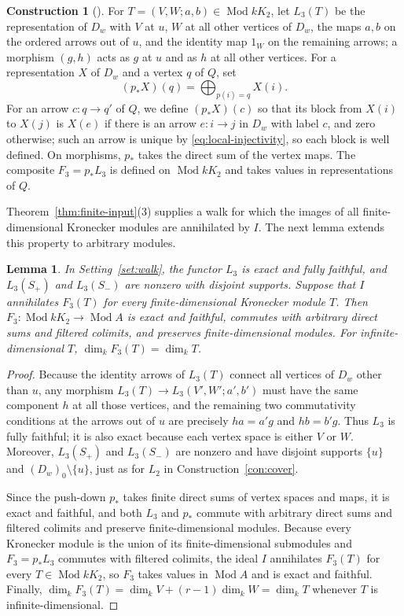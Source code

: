 \documentclass[a4paper,reqno,10pt]{amsart}
\newtheorem{lemma}[theorem]{Lemma}
\theoremstyle{definition}
\newtheorem{construction}[theorem]{Construction}
\DeclareMathOperator{\Mod}{Mod}
\newcommand{\dm}{\dim_k}
\numberwithin{equation}{section}
\begin{document}
\begin{construction}[{\cite[proof of Theorem~7]{Bongartz}}]\label{con:walk}
For $T=(V,W;a,b)\in\Mod kK_2$, let $L_3(T)$ be the representation of $D_w$ with $V$ at $u$, $W$ at all other
vertices of $D_w$, the maps $a,b$ on the ordered arrows out of $u$, and the identity
map $1_W$ on the remaining arrows; a morphism $(g,h)$ acts as $g$ at $u$ and as $h$ at all other vertices.
For a representation $X$ of $D_w$ and a vertex $q$ of $Q$, set
\[
 (p_*X)(q)=\bigoplus_{p(i)=q}X(i).
\]
For an arrow $c:q\to q'$ of $Q$, we define $(p_*X)(c)$ so that its block from $X(i)$ to $X(j)$
is $X(e)$ if there is an arrow $e:i\to j$ in $D_w$ with label $c$, and zero
otherwise; such an arrow is unique by \eqref{eq:local-injectivity}, so
each block is well defined. On morphisms, $p_*$ takes the direct sum of the
vertex maps. The composite $F_3=p_*L_3$ is defined on
$\Mod kK_2$ and takes values in representations of $Q$.
\end{construction}
Theorem~\ref{thm:finite-input}(3) supplies a walk for which the images
of all finite-dimensional Kronecker modules are annihilated by $I$.
The next lemma extends this property to arbitrary modules.
\begin{lemma}\label{lem:F3-properties}
In Setting~\ref{set:walk}, the functor $L_3$ is exact and fully faithful,
and $L_3(S_+)$ and $L_3(S_-)$ are nonzero with disjoint supports.
Suppose that $I$ annihilates $F_3(T)$ for every finite-dimensional
Kronecker module $T$. Then $F_3:\Mod kK_2\to\Mod A$ is exact and
faithful, commutes with arbitrary direct sums and filtered colimits,
and preserves finite-dimensional modules. For infinite-dimensional $T$,
$\dm F_3(T)=\dm T$.
\end{lemma}
\begin{proof}
Because the identity arrows of $L_3(T)$ connect all vertices of $D_w$ other than $u$, any morphism $L_3(T)\to L_3(V',W';a',b')$
must have the same component $h$ at all those vertices, and the remaining two commutativity conditions at the arrows out of $u$ are precisely $ha=a'g$ and $hb=b'g$. Thus $L_3$ is fully
faithful; it is also exact because each vertex space is either $V$ or $W$. Moreover,
$L_3(S_+)$ and $L_3(S_-)$ are nonzero and have disjoint supports $\{u\}$
and $(D_w)_0\setminus\{u\}$, just as for $L_2$ in Construction~\ref{con:cover}.

Since the push-down $p_*$ takes finite direct sums of vertex
spaces and maps, it is exact and faithful, and both $L_3$ and $p_*$ commute
with arbitrary direct sums and filtered colimits and preserve finite-dimensional modules.
Because every Kronecker module is the union of its finite-dimensional
submodules and $F_3=p_*L_3$ commutes with filtered colimits, the ideal
$I$ annihilates $F_3(T)$ for every $T\in\Mod kK_2$, so $F_3$ takes values in $\Mod A$ and is exact and faithful.
Finally, $\dm F_3(T)=\dm V+(r-1)\dm W=\dm T$ whenever $T$ is
infinite-dimensional.
\end{proof}
\end{document}
